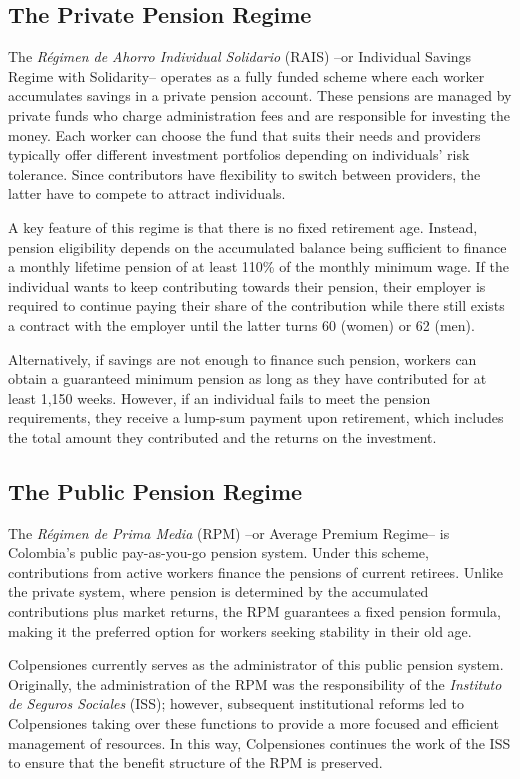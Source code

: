 \documentclass[12pt, a4paper]{article}
\begin{document}
\subsection{The Private Pension Regime}

The \textit{Régimen de Ahorro Individual Solidario} (RAIS) --or Individual Savings Regime with Solidarity-- operates as a fully funded scheme where each worker accumulates savings in a private pension account. These pensions are managed by private funds who charge administration fees and are responsible for investing the money. Each worker can choose the fund that suits their needs and providers typically offer different investment portfolios depending on individuals' risk tolerance. Since contributors have flexibility to switch between providers, the latter have to compete to attract individuals.

A key feature of this regime is that there is no fixed retirement age. Instead, pension eligibility depends on the accumulated balance being sufficient to finance a monthly lifetime pension of at least 110\% of the monthly minimum wage. If the individual wants to keep contributing towards their pension, their employer is required to continue paying their share of the contribution while there still exists a contract with the employer until the latter turns 60 (women) or 62 (men).

Alternatively, if savings are not enough to finance such pension, workers can obtain a guaranteed minimum pension as long as they have contributed for at least 1,150 weeks. However, if an individual fails to meet the pension requirements, they receive a lump-sum payment upon retirement, which includes the total amount they contributed and the returns on the investment. 

\subsection{The Public Pension Regime}
The \textit{Régimen de Prima Media} (RPM) --or Average Premium Regime-- is Colombia's public pay-as-you-go pension system. Under this scheme, contributions from active workers finance the pensions of current retirees. Unlike the private system, where pension is determined by the accumulated contributions plus market returns, the RPM guarantees a fixed pension formula, making it the preferred option for workers seeking stability in their old age.

Colpensiones currently serves as the administrator of this public pension system. Originally, the administration of the RPM was the responsibility of the \textit{Instituto de Seguros Sociales} (ISS); however, subsequent institutional reforms led to Colpensiones taking over these functions to provide a more focused and efficient management of resources. In this way, Colpensiones continues the work of the ISS to ensure that the benefit structure of the RPM is preserved.
\end{document}
